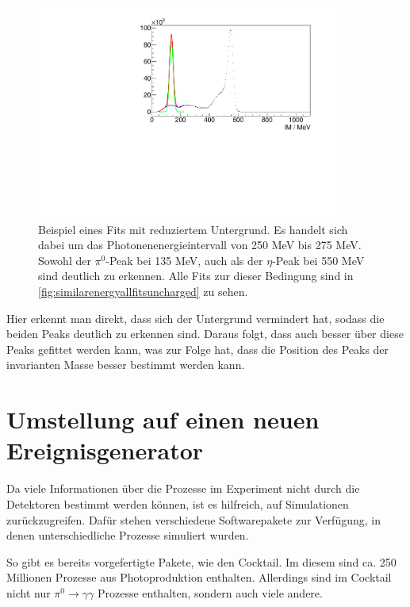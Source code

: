 \documentclass[a4paper,11pt,oneside,final,german,openbib,pdftex]{scrbook}
\begin{document}
{\begin{figure}[h!]
	\begin{center}
		\includegraphics[width=100mm]{NewCalib/Strahlzeit2014/20171904RealUnchargedFitExample}
	\end{center}
\caption[Strahlzeit: Beispiel eines Fits mit reduziertem Untergrund]{Beispiel eines Fits mit reduziertem Untergrund. Es handelt sich dabei um das Photonenenergieintervall von 250 MeV bis 275 MeV. Sowohl der $\pi^0$-Peak bei 135 MeV, auch als der $\eta$-Peak bei 550 MeV sind deutlich zu erkennen. Alle Fits zur dieser Bedingung sind in \ref{fig:similarenergyallfitsuncharged} zu sehen.}
\label{fig:Reduzierter-Untergrund-Fit}
\end{figure}

 Hier erkennt man direkt, dass sich der Untergrund vermindert hat, sodass die beiden Peaks deutlich zu erkennen sind. Daraus folgt, dass auch besser \"uber diese Peaks gefittet werden kann, was zur Folge hat, dass die Position des Peaks der invarianten Masse besser bestimmt werden kann.


\section{Umstellung auf einen neuen Ereignisgenerator}
\label{sec:Vorbereitung-der-Simulation}

Da viele Informationen \"uber die Prozesse im Experiment nicht durch die Detektoren bestimmt werden k\"onnen, ist es hilfreich, auf Simulationen zur\"uckzugreifen. Daf\"ur stehen verschiedene Softwarepakete zur Verf\"ugung, in denen unterschiedliche Prozesse simuliert wurden.

So gibt es bereits vorgefertigte Pakete, wie den Cocktail.
Im diesem sind ca. 250 Millionen Prozesse aus Photoproduktion enthalten. Allerdings sind im Cocktail nicht nur $\pi^0 \rightarrow \gamma \gamma$ Prozesse enthalten, sondern auch viele andere.

}
\end{document}
